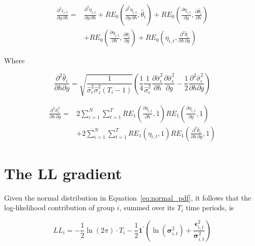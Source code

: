 \documentclass[12pt]{article}
\begin{document}
\begin{align}
\frac{\partial^{2} \epsilon_{i,t}}{\partial g \, \partial h} = {} & 
\frac{\partial^{2} \eta_{i,t}}{\partial g \, \partial h} 
+ RE_{0} \left( \frac{\partial^{2} \eta_{i,t}}{\partial g \, \partial h}, \widehat{\theta}_{i} \right) 
+ RE_{0} \left( \frac{\partial \eta_{i,t}}{\partial g}, \frac{\partial \widehat{\theta}_{i}}{\partial h} \right) \nonumber \\
& + RE_{0} \left( \frac{\partial \eta_{i,t}}{\partial h}, \frac{\partial \widehat{\theta}_{i}}{\partial g} \right) 
+ RE_{0} \left( \eta_{i,t}, \frac{\partial^{2} \widehat{\theta}_{i}}{\partial h \, \partial g} \right)
\label{eq:re16}
\end{align}


Where

\begin{equation}
\frac{\partial^{2}{\widehat{\theta}}_{i}}{\partial h\partial g} = \sqrt{\frac{1}{{\widehat{\sigma}}_{\epsilon}^{2}{\widehat{\sigma}}_{z}^{2}\left( T_{i} - 1 \right)}}\left( \frac{1}{4}\frac{1}{{\widehat{\sigma}}_{\epsilon}^{2}}\frac{\partial{\widehat{\sigma}}_{\epsilon}^{2}}{\partial h}\frac{\partial{\widehat{\sigma}}_{\epsilon}^{2}}{\partial g} - \frac{1}{2}\frac{\partial^{2}{\widehat{\sigma}}_{\epsilon}^{2}}{\partial h\partial g} \right)
\label{eq:re17}
\end{equation}

\begin{align}
\frac{\partial^{2} \widehat{\sigma}_{\epsilon}^{2}}{\partial h \, \partial g} = {} & 
2 \sum_{i = 1}^{N} \sum_{t = 1}^{T} 
RE_{1} \left( \frac{\partial \eta_{i,t}}{\partial h}, 1 \right) 
RE_{1} \left( \frac{\partial \eta_{i,t}}{\partial g}, 1 \right) \nonumber \\
& + 2 \sum_{i = 1}^{N} \sum_{t = 1}^{T} 
RE_{1} \left( \eta_{i,t}, 1 \right) 
RE_{1} \left( \frac{\partial^{2} \widehat{\theta}_{i}}{\partial h \, \partial g}, 1 \right)
\label{eq:re18}
\end{align}

\section{The LL gradient}\label{the-ll-gradient}

Given the normal distribution in Equation~\ref{eq:normal_pdf}, it follows that the log-likelihood contribution of group $i$, summed over its $T_i$ time periods, is

\begin{equation}
{LL}_{i} = - \frac{1}{2}\ln(2\pi) \cdot T_i - \frac{1}{2}\mathbf{1}^{'}\left(\ln\left(\mathbf{\sigma}_{i,t}^{2} \right)+\frac{{\mathbf{\epsilon}_{i,t}^{2}}}{\mathbf{\sigma}_{i,t}^{2}}\right)
\label{eq:52}
\end{equation}
\end{document}
